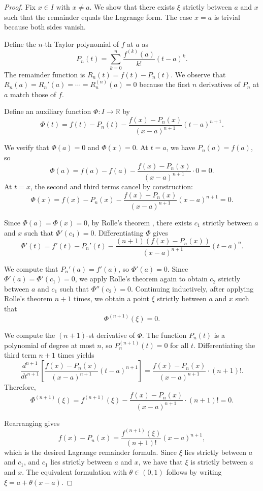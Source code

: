 \begin{proof}
Fix $x \in I$ with $x \neq a$. We show that there exists $\xi$ strictly between $a$ and $x$ such that the remainder equals the Lagrange form. The case $x = a$ is trivial because both sides vanish.

Define the $n$-th Taylor polynomial of $f$ at $a$ as
$$P_n(t) = \sum_{k=0}^n \frac{f^{(k)}(a)}{k!}(t - a)^k.$$
The remainder function is $R_n(t) = f(t) - P_n(t)$. We observe that $R_n(a) = R_n'(a) = \cdots = R_n^{(n)}(a) = 0$ because the first $n$ derivatives of $P_n$ at $a$ match those of $f$.

Define an auxiliary function $\Phi : I \to \mathbb{R}$ by
$$\Phi(t) = f(t) - P_n(t) - \frac{f(x) - P_n(x)}{(x - a)^{n+1}}(t - a)^{n+1}.$$

We verify that $\Phi(a) = 0$ and $\Phi(x) = 0$. At $t = a$, we have $P_n(a) = f(a)$, so
$$\Phi(a) = f(a) - f(a) - \frac{f(x) - P_n(x)}{(x - a)^{n+1}} \cdot 0 = 0.$$
At $t = x$, the second and third terms cancel by construction:
$$\Phi(x) = f(x) - P_n(x) - \frac{f(x) - P_n(x)}{(x - a)^{n+1}}(x - a)^{n+1} = 0.$$

Since $\Phi(a) = \Phi(x) = 0$, by Rolle's theorem , there exists $c_1$ strictly between $a$ and $x$ such that $\Phi'(c_1) = 0$. Differentiating $\Phi$ gives
$$\Phi'(t) = f'(t) - P_n'(t) - \frac{(n+1)(f(x) - P_n(x))}{(x - a)^{n+1}}(t - a)^n.$$

We compute that $P_n'(a) = f'(a)$, so $\Phi'(a) = 0$. Since $\Phi'(a) = \Phi'(c_1) = 0$, we apply Rolle's theorem again to obtain $c_2$ strictly between $a$ and $c_1$ such that $\Phi''(c_2) = 0$. Continuing inductively, after applying Rolle's theorem $n+1$ times, we obtain a point $\xi$ strictly between $a$ and $x$ such that
$$\Phi^{(n+1)}(\xi) = 0.$$

We compute the $(n+1)$-st derivative of $\Phi$. The function $P_n(t)$ is a polynomial of degree at most $n$, so $P_n^{(n+1)}(t) = 0$ for all $t$. Differentiating the third term $n+1$ times yields
$$\frac{d^{n+1}}{dt^{n+1}} \left[ \frac{f(x) - P_n(x)}{(x - a)^{n+1}}(t - a)^{n+1} \right] = \frac{f(x) - P_n(x)}{(x - a)^{n+1}} \cdot (n+1)!.$$
Therefore,
$$\Phi^{(n+1)}(\xi) = f^{(n+1)}(\xi) - \frac{f(x) - P_n(x)}{(x - a)^{n+1}} \cdot (n+1)! = 0.$$

Rearranging gives
$$f(x) - P_n(x) = \frac{f^{(n+1)}(\xi)}{(n+1)!}(x - a)^{n+1},$$
which is the desired Lagrange remainder formula. Since $\xi$ lies strictly between $a$ and $c_1$, and $c_1$ lies strictly between $a$ and $x$, we have that $\xi$ is strictly between $a$ and $x$. The equivalent formulation with $\theta \in (0, 1)$ follows by writing $\xi = a + \theta(x - a)$.
\end{proof}
